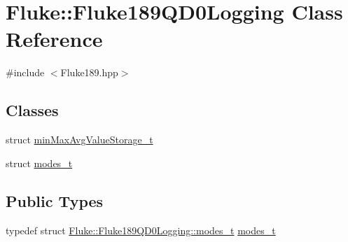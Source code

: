 \hypertarget{classFluke_1_1Fluke189QD0Logging}{
\section{Fluke::Fluke189QD0Logging Class Reference}
\label{classFluke_1_1Fluke189QD0Logging}
}


{\ttfamily \#include $<$Fluke189.hpp$>$}\subsection*{Classes}
\begin{DoxyCompactItemize}
\item 
struct \hyperlink{structFluke_1_1Fluke189QD0Logging_1_1minMaxAvgValueStorage__t}{minMaxAvgValueStorage\_\-t}
\item 
struct \hyperlink{structFluke_1_1Fluke189QD0Logging_1_1modes__t}{modes\_\-t}
\end{DoxyCompactItemize}
\subsection*{Public Types}
\begin{DoxyCompactItemize}
\item 
typedef struct \hyperlink{structFluke_1_1Fluke189QD0Logging_1_1modes__t}{Fluke::Fluke189QD0Logging::modes\_\-t} \hyperlink{classFluke_1_1Fluke189QD0Logging_aa9e03c2f5b92478c1f3182fc7b9a0a60}{modes\_\-t}
\end{DoxyCompactItemize}
